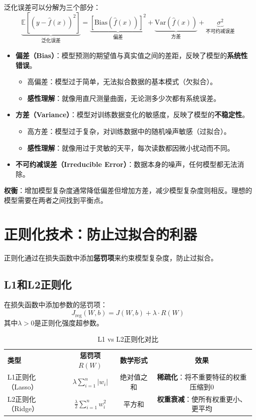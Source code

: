 泛化误差可以分解为三个部分：
\[
\underbrace{\mathbb{E}[(y - \hat{f}(x))^2]}_{\text{泛化误差}} = \underbrace{[\text{Bias}(\hat{f}(x))]^2}_{\text{偏差}} + \underbrace{\text{Var}(\hat{f}(x))}_{\text{方差}} + \underbrace{\sigma^2}_{\text{不可约减误差}}
\]

\begin{itemize}
    \item \textbf{偏差（Bias）}：模型预测的期望值与真实值之间的差距，反映了模型的\textbf{系统性错误}。
    \begin{itemize}
        \item 高偏差：模型过于简单，无法拟合数据的基本模式（欠拟合）。
        \item \textbf{感性理解}：就像用直尺测量曲面，无论测多少次都有系统误差。
    \end{itemize}
    
    \item \textbf{方差（Variance）}：模型对训练数据变化的敏感度，反映了模型的\textbf{不稳定性}。
    \begin{itemize}
        \item 高方差：模型过于复杂，对训练数据中的随机噪声敏感（过拟合）。
        \item \textbf{感性理解}：就像用过于灵敏的天平，每次读数都因微小扰动而不同。
    \end{itemize}
    
    \item \textbf{不可约减误差（Irreducible Error）}：数据本身的噪声，任何模型都无法消除。
\end{itemize}

\textbf{权衡}：增加模型复杂度通常降低偏差但增加方差，减少模型复杂度则相反。理想的模型需要在两者之间找到平衡点。

\section{正则化技术：防止过拟合的利器}

正则化通过在损失函数中添加\textbf{惩罚项}来约束模型复杂度，防止过拟合。

\subsection{L1和L2正则化}

在损失函数中添加参数的惩罚项：
\[
J_{\text{reg}}(W, b) = J(W, b) + \lambda \cdot R(W)
\]
其中$\lambda > 0$是正则化强度超参数。

\begin{table}[h]
\centering
\caption{L1 vs L2正则化对比}
\begin{tabular}{lccc}
\textbf{类型} & \textbf{惩罚项} $R(W)$ & \textbf{数学形式} & \textbf{效果} \\
L1正则化（Lasso） & $\lambda \sum_{i=1}^n |w_i|$ & 绝对值之和 & \textbf{稀疏化}：将不重要特征的权重压缩到0 \\
L2正则化（Ridge） & $\frac{\lambda}{2} \sum_{i=1}^n w_i^2$ & 平方和 & \textbf{权重衰减}：使所有权重更小、更平均 \\
\end{tabular}
\end{table}

